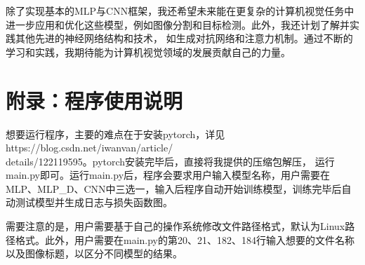 \documentclass[UTF8]{ctexart}
\begin{document}
除了实现基本的MLP与CNN框架，我还希望未来能在更复杂的计算机视觉任务中进一步应用和优化这些模型，例如图像分割和目标检测。此外，我还计划了解并实践其他先进的神经网络结构和技术，
如生成对抗网络和注意力机制。通过不断的学习和实践，我期待能为计算机视觉领域的发展贡献自己的力量。
\section{附录：程序使用说明}
想要运行程序，主要的难点在于安装pytorch，详见https://blog.csdn.net/iwanvan/article/\\details/122119595。pytorch安装完毕后，直接将我提供的压缩包解压，
运行main.py即可。运行main.py后，程序会要求用户输入模型名称，用户需要在MLP、MLP\_D、CNN中三选一，输入后程序自动开始训练模型，训练完毕后自动测试模型并生成日志与损失函数图。

需要注意的是，用户需要基于自己的操作系统修改文件路径格式，默认为Linux路径格式。此外，用户需要在main.py的第20、21、182、184行输入想要的文件名称以及图像标题，以区分不同模型的结果。
\end{document}
